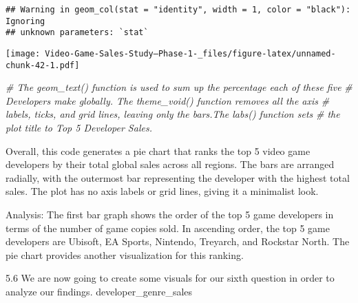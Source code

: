 \documentclass[
]{article}
\newenvironment{Shaded}{\begin{snugshade}}{\end{snugshade}}
\newcommand{\CommentTok}[1]{\textcolor[rgb]{0.56,0.35,0.01}{\textit{#1}}}
\begin{document}
\begin{verbatim}
## Warning in geom_col(stat = "identity", width = 1, color = "black"): Ignoring
## unknown parameters: `stat`
\end{verbatim}

\texttt{[image: Video-Game-Sales-Study--Phase-1-\_files/figure-latex/unnamed-chunk-42-1.pdf]}

\begin{Shaded}
\begin{Highlighting}[]
\CommentTok{\# The geom\_text() function is used to sum up the percentage each of these five}
\CommentTok{\# Developers make globally. The theme\_void() function removes all the axis}
\CommentTok{\# labels, ticks, and grid lines, leaving only the bars.The labs() function sets}
\CommentTok{\# the plot title to \textquotesingle{}Top 5 Developer Sales\textquotesingle{}.}
\end{Highlighting}
\end{Shaded}

Overall, this code generates a pie chart that ranks the top 5 video game
developers by their total global sales across all regions. The bars are
arranged radially, with the outermost bar representing the developer
with the highest total sales. The plot has no axis labels or grid lines,
giving it a minimalist look.

Analysis: The first bar graph shows the order of the top 5 game
developers in terms of the number of game copies sold. In ascending
order, the top 5 game developers are Ubisoft, EA Sports, Nintendo,
Treyarch, and Rockstar North. The pie chart provides another
visualization for this ranking.

5.6 We are now going to create some visuals for our sixth question in
order to analyze our findings. developer\_genre\_sales
\end{document}
